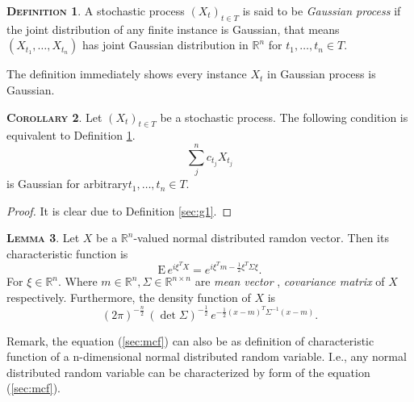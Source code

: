 \documentclass[a4paper, twoside, 11pt]{article}
\theoremstyle{definition}
\newtheorem{definition}{\scshape Definition}[section]
\newtheorem{lemma}[definition]{\scshape Lemma}
\newtheorem{corollary}[definition]{\scshape Corollary}
\begin{document}
\begin{definition}
  A stochastic process $(X_t)_{t\in T}$ is said to be \emph{Gaussian process} if the joint distribution of any finite instance is Gaussian, that means
$
(X_{t_1},\dots, X_{t_n})
$ has joint Gaussian distribution in $\mathbb{R}^n$ for $t_1,\dots,t_n \in T$.
\label{sec:defgau}
\end{definition}
The definition immediately shows every instance $X_t$ in Gaussian process is Gaussian.

\begin{corollary}
  Let $(X_t)_{t\in T}$ be a stochastic process. The following condition is equivalent to Definition \ref{sec:defgau}.
  \begin{equation}
	\sum_j^n c_{t_j} X_{t_j}
  \end{equation}
  is Gaussian for arbitrary$t_1,\dots,t_n \in T$.
  \label{sec:gauss}
\end{corollary}
\begin{proof}
  It is clear due to Definition \ref{sec:g1}.
\end{proof}

\begin{lemma}
  Let $X$ be a $\mathbb{R}^{n}$-valued normal distributed ramdon vector. Then its characteristic function is 
  \begin{equation}
	\mathrm{E}\,e^{i\xi^TX} = e^{i\xi^Tm - \frac{1}{2}\xi^T \Sigma \xi}.
	\label{sec:mcf}
  \end{equation}
 For $\xi \in \mathbb{R}^{n}$. Where $m \in \mathbb{R}^{n}, \Sigma \in \mathbb{R}^{n\times n}$ are \emph{mean vector} , \emph{covariance matrix} of $X$ respectively. Furthermore, the density function of $X$ is
\begin{equation}
  (2\pi)^{-\frac{n}{2}}\, (\det\Sigma) ^{-\frac{1}{2}}\,e^{-\frac{1}{2}(x-m)^T\Sigma^{-1}(x-m)}.
  \label{sec:dsy}
\end{equation}
\end{lemma}

Remark, the equation (\ref{sec:mcf}) can also be as definition of characteristic function of a n-dimensional normal distributed random variable. I.e., any normal distributed random variable can be characterized by form of the equation (\ref{sec:mcf}).
\end{document}
